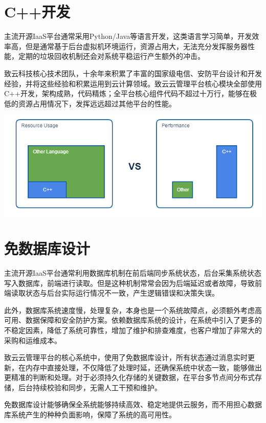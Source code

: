 \documentclass[letterpaper,10pt]{sphinxmanual}
\begin{document}
\section{C++开发}
\label{index:c}
主流开源IaaS平台通常采用Python/Java等语言开发，这类语言学习简单，开发效率高，但是通常基于后台虚拟机环境运行，资源占用大，无法充分发挥服务器性能，定期的垃圾回收机制还会对系统平稳运行产生额外的冲击。

致云科技核心技术团队，十余年来积累了丰富的国家级电信、安防平台设计和开发经验，并将这些经验和积累运用到云计算领域。致云云管理平台核心模块全部使用C++开发，架构成熟，代码精炼；全平台核心组件代码不超过十万行，能够在极低的资源占用情况下，发挥远远超过其他平台的性能。

\includegraphics{2_4_cpp.png}


\section{免数据库设计}
\label{index:id12}
主流开源IaaS平台通常利用数据库机制在前后端同步系统状态，后台采集系统状态写入数据库，前端进行读取。但是这种机制常常会因为后端延迟或者故障，导致前端读取状态与后台实际运行情况不一致，产生逻辑错误和决策失误。

此外，数据库系统速度慢，处理复杂，本身也是一个系统故障点，必须额外考虑高可用、数据保障和安全防护方案。依赖数据库系统的设计，在系统中引入了更多的不稳定因素，降低了系统可靠性，增加了维护和排查难度，也客户增加了非常大的采购和运维成本。

致云云管理平台的核心系统中，使用了免数据库设计，所有状态通过消息实时更新，在内存中直接处理，不仅降低了处理时延，还确保系统中状态一致，能够做出更精准的判断和处理。对于必须持久化存储的关键数据，在平台多节点间分布式存储，后台持续校验和同步，无需人工干预和维护。

免数据库设计能够确保全系统能够持续高效、稳定地提供云服务，而不用担心数据库系统产生的种种负面影响，保障了系统的高可用性。
\end{document}
